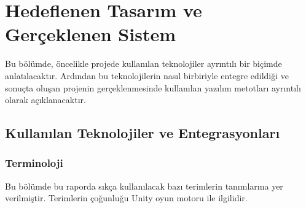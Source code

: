 \documentclass[a4paper, 12pt, titlepage]{article}
\begin{document}
\section{Hedeflenen Tasarım ve Gerçeklenen Sistem}
Bu bölümde, öncelikle projede kullanılan teknolojiler ayrıntılı bir biçimde anlatılacaktır.
Ardından bu teknolojilerin nasıl birbiriyle entegre edildiği ve sonuçta oluşan projenin
gerçeklenmesinde kullanılan yazılım metotları ayrıntılı olarak açıklanacaktır.
\subsection{Kullanılan Teknolojiler ve Entegrasyonları}
\subsubsection{Terminoloji}

Bu bölümde bu raporda sıkça kullanılacak bazı terimlerin tanımlarına yer verilmiştir. Terimlerin
çoğunluğu Unity oyun motoru ile ilgilidir.
\end{document}
